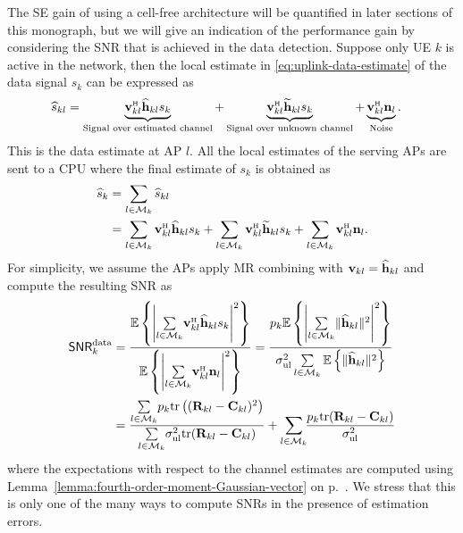 The SE gain of using a cell-free architecture will be quantified in later sections of this monograph, but we will give an indication of the performance gain by considering the SNR that is achieved in the data detection.
Suppose only UE $k$ is active in the network, then the local estimate in \eqref{eq:uplink-data-estimate} of the data signal $s_{k}$  can be expressed as
\begin{align} \notag
\widehat{s}_{kl} &= \underbrace{\vect{v}_{kl}^{\Htran} \widehat{\vect{h}}_{kl}s_{k}}_{\textrm{Signal over estimated channel}} + \underbrace{\vect{v}_{kl}^{\Htran} \widetilde{\vect{h}}_{kl}s_{k}}_{\textrm{Signal over unknown channel}} +  \underbrace{\vect{v}_{kl}^{\Htran}{\bf n}_{l}}_{\textrm{Noise}}
\label{eq:uplink-data-estimate-single-UE}.
\end{align} 
This is the data estimate at AP $l$.
All the local estimates of the serving APs are sent to a CPU where the final estimate of $s_k$ is obtained as
\begin{align} \notag
\widehat s_{k} &= \sum_{l\in \mathcal{M}_k} \widehat s_{kl} \\
&= \sum_{l\in \mathcal{M}_k} \vect{v}_{kl}^{\Htran} \widehat{\vect{h}}_{kl}s_{k} +  \sum_{l\in \mathcal{M}_k}\vect{v}_{kl}^{\Htran} \widetilde{\vect{h}}_{kl}s_{k} + \sum_{l\in \mathcal{M}_k} \vect{v}_{kl}^{\Htran}{\bf n}_{l}.
\end{align}
For simplicity, we assume the APs apply \gls{MR} combining with $\mathbf{v}_{kl} = \widehat{{\bf h}}_{kl}$ and compute the resulting SNR as
\begin{align} \notag
\mathacr{SNR}_{k}^{\text{data}} &= 
\frac{\mathbb{E} \left\{ \left| \sum\limits_{l\in \mathcal{M}_k} \! \vect{v}_{kl}^{\Htran} \widehat{\vect{h}}_{kl}s_{k} \right|^2 \right\}}{ \mathbb{E} \left\{ \left| \sum\limits_{l\in \mathcal{M}_k} \! \vect{v}_{kl}^{\Htran}{\bf n}_{l} \right|^2 \right\}}  = 
\frac{p_k \mathbb{E} \left\{ \left| \sum\limits_{l\in \mathcal{M}_k} \! \| \widehat{\vect{h}}_{kl} \|^2 \right|^2 \right\}}{ \sigmaUL \sum\limits_{l\in \mathcal{M}_k}  \mathbb{E} \left\{ \| \widehat{{\bf h}}_{kl} \|^2 \right\}} 
\\ &=
\frac{\sum\limits_{l\in \mathcal{M}_k} \! p_k  \tr \left( (\vect{R}_{kl}-\vect{C}_{kl})^2 \right)  }{ \sum\limits_{l\in \mathcal{M}_k} \! \sigmaUL  \tr(\vect{R}_{kl}-\vect{C}_{kl}) } + \sum\limits_{l\in \mathcal{M}_k} \! \! \frac{p_k \tr(\vect{R}_{kl}-\vect{C}_{kl}) }{\sigmaUL} \label{eq:SNR-simple} 
\end{align}
where the expectations with respect to the channel estimates are computed using Lemma~\ref{lemma:fourth-order-moment-Gaussian-vector} on p.~\pageref{lemma:fourth-order-moment-Gaussian-vector}. We stress that this is only one of the many ways to compute SNRs in the presence of estimation errors.

